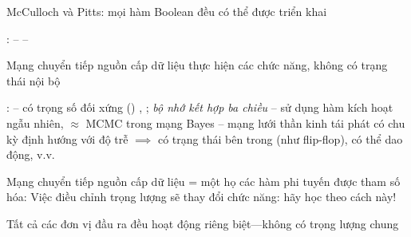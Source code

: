 \documentclass{article}
\begin{document}
\begin{huge}

\vspace*{0.2in}

\textwidth
{}

McCulloch và Pitts: mọi hàm Boolean đều có thể được triển khai




:\al
-- \al
-- 

Mạng chuyển tiếp nguồn cấp dữ liệu thực hiện các chức năng, không có trạng thái nội bộ

:\al
--  có trọng số đối xứng ()\nl
   , ; \emph{bộ nhớ kết hợp ba chiều}\al
--  sử dụng hàm kích hoạt ngẫu nhiên, \nl
   $\approx$ MCMC trong mạng Bayes\al
-- mạng lưới thần kinh tái phát có chu kỳ định hướng với độ trễ\nl
  $\implies$ có trạng thái bên trong (như flip-flop), có thể dao động, v.v.



\vspace*{0.2in}

\textwidth
{}

Mạng chuyển tiếp nguồn cấp dữ liệu = một họ các hàm phi tuyến được tham số hóa:
Việc điều chỉnh trọng lượng sẽ thay đổi chức năng: hãy học theo cách này!




Tất cả các đơn vị đầu ra đều hoạt động riêng biệt---không có trọng lượng chung


\end{huge}
\end{document}
